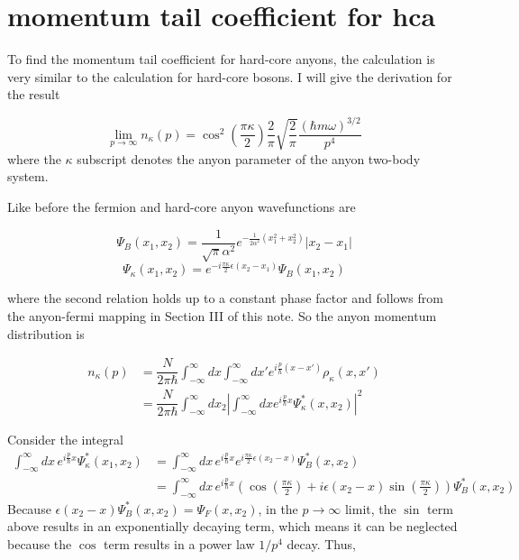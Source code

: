 \documentclass[onecolumn,english,aps,pra]{revtex4}
\begin{document}
\section{momentum tail coefficient for hca}

To find the momentum tail coefficient for hard-core anyons, the calculation is very similar to the calculation for hard-core bosons. I will give the derivation for the result

\[
\lim_{p \rightarrow \infty} n_\kappa(p) = \cos^2\left(\frac{\pi \kappa}{2}\right) \dfrac{2}{\pi} \sqrt{\dfrac{2}{\pi}} \dfrac{(\hbar m \omega)^{3/2}}{p^4}
\]
where the $\kappa$ subscript denotes the anyon parameter of the anyon two-body system. 

Like before the fermion and hard-core anyon wavefunctions are

\[ \Psi_{B}(x_{1},x_{2}) = \dfrac{1}{\sqrt{\pi} \alpha^2} e^{-\frac{1}{2\alpha^2} (x_{1}^2 + x_{2}^2)} |x_{2} - x_{1}| \]
\[ \Psi_\kappa(x_{1},x_{2}) = e^{-i \frac{\pi \kappa}{2}  \epsilon(x_{2} - x_{1})} \Psi_{B}(x_{1},x_{2})   \]

where the second relation holds up to a constant phase factor and follows from the anyon-fermi mapping in Section III of this note. So the anyon momentum distribution is

\begin{align*}
n_\kappa (p) & = \dfrac{N}{2 \pi \hbar} \int_{-\infty}^{\infty} dx \int_{-\infty}^{\infty} dx' e^{i \frac{p}{\hbar} (x - x')} \rho_\kappa(x,x')\\
& =  \dfrac{N}{2 \pi \hbar} \int_{-\infty}^{\infty} dx_{2} 
\left|\int_{-\infty}^{\infty} dx  e^{i \frac{p}{\hbar} x} \Psi_\kappa^*(x,x_{2}) \right|^2
\end{align*}

Consider the integral
\begin{align*}
\int_{-\infty}^{\infty} dx \, e^{i \frac{p}{\hbar} x} \Psi_\kappa^*(x_{1},x_{2}) & = 
\int_{-\infty}^{\infty} dx \, e^{i \frac{p}{\hbar} x}  e^{i \frac{\pi \kappa}{2}  \epsilon(x_{2} - x)} \Psi_{B}^*(x, x_{2})\\
& = \int_{-\infty}^{\infty} dx \, e^{i \frac{p}{\hbar} x} \left( \cos\left(\frac{\pi \kappa}{2}\right) + i \epsilon(x_{2} - x) \sin\left(\frac{\pi \kappa}{2} \right) \right) \Psi_{B}^*(x, x_{2})
\end{align*}
Because $\epsilon(x_{2} - x)\Psi_{B}^*(x, x_{2}) = \Psi_{F}(x, x_{2}) $, in the $p \rightarrow \infty$ limit, the $\sin$ term above results in an exponentially decaying term, which means it can be neglected because the $\cos$ term results in a power law $1/p^4$ decay. Thus,
\end{document}
